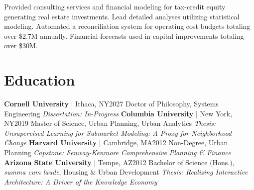 \documentclass{article}
\begin{document}
\begin{bgbox}[
        height = \paperheight,
        width = 0.69\textwidth,
        colback = white
    ]
{                Provided consulting services and financial modeling for tax-credit equity generating real estate investments. Lead detailed analyses utilizing statistical modeling. Automated a reconciliation system for operating cost budgets totaling over \$2.7M annually. Financial forecasts used in capital improvements totaling over \$30M.
            \section*{Education}
                \textbf{Cornell University} | Ithaca, NY\hfill{2027}\newline
                        Doctor of Philosophy, Systems Engineering\newline
                            \textit{Dissertation: In-Progress}\newline\newline
                \textbf{Columbia University} | New York, NY\hfill{2019}\newline
                        Master of Science, Urban Planning, Urban Analytics\newline
                            \textit{Thesis: Unsupervised Learning for Submarket Modeling: A Proxy for Neighborhood Change}\newline\newline
                \textbf{Harvard University} | Cambridge, MA\hfill{2012}\newline
                        Non-Degree, Urban Planning\newline
                            \textit{Capstone: Fenway-Kenmore Comprehensive Planning \& Finance}\newline\newline
                \textbf{Arizona State University} | Tempe, AZ\hfill{2012}\newline 
                        Bachelor of Science $($Hons.$)$, \textit{summa cum laude}, Housing \& Urban Development\newline
                            \textit{Thesis: Realizing Interactive Architecture: A Driver of the Knowledge Economy}
}
\end{bgbox}
\end{document}
